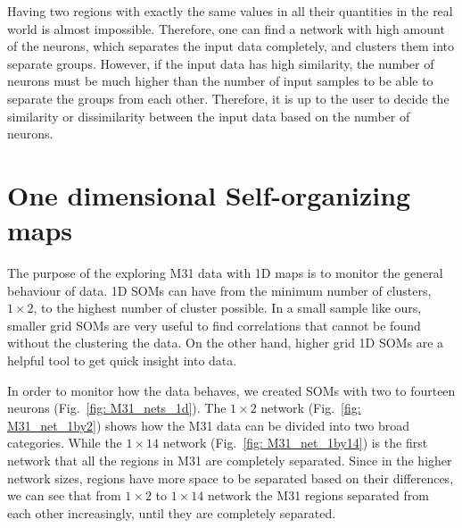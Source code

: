 Having two regions with exactly the same values in all their quantities in the real world is almost impossible. 
Therefore, one can find a network with high amount of the neurons, which separates the input data completely, and clusters them into separate groups.
However, if the input data has high similarity, the number of neurons must be much higher than the number of input samples to be able to separate the groups from each other. 
Therefore, it is up to the user to decide the similarity or dissimilarity between the input data based on the number of neurons. 

\section{One dimensional Self-organizing maps}
    \label{Sec: 1d_cluster}
    The purpose of the exploring M31 data with 1D maps is to monitor the general behaviour of data. 
    1D SOMs can have from the minimum number of clusters, $1\times2$, to the highest number of cluster possible.
    In a small sample like ours, smaller grid SOMs are very useful to find correlations that cannot be found without the clustering the data.
    On the other hand, higher grid 1D SOMs are a helpful tool to get quick insight into data.

        In order to monitor how the data behaves, we created SOMs with two to fourteen neurons (Fig.~\ref{fig: M31_nets_1d}).
        The $1\times2$ network (Fig.~\ref{fig: M31_net_1by2}) shows how the M31 data can be divided into two broad categories.
        While the $1\times14$ network (Fig.~\ref{fig: M31_net_1by14}) is the first network that all the regions in M31 are completely separated.
        Since in the higher network sizes, regions have more space to be separated based on their differences, we can see that from $1\times2$ to $1\times14$ network the M31 regions separated from each other increasingly, until they are completely separated. 
        
